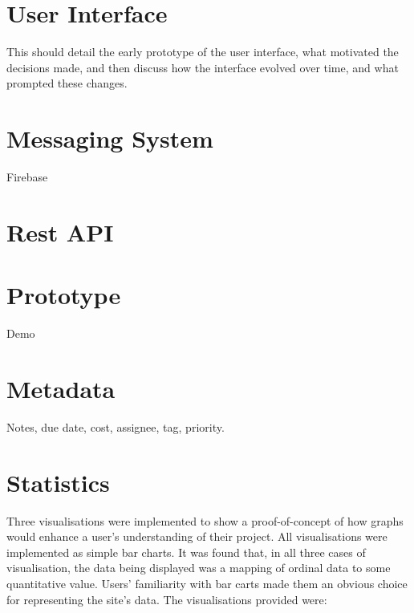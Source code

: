 \documentclass[a4paper]{l3proj}
\begin{document}
  \section{User Interface}
  \label{userInterface}

  This should detail the early prototype of the user interface, what motivated the decisions made, 
  and then discuss how the interface evolved over time, and what prompted these changes.

  \section{Messaging System}
  \label{messagingSystem}

  Firebase

  \section{Rest API}
  \label{restApi}


  \section{Prototype}
  \label{prototype}

  Demo

  \section{Metadata}
  \label{metadata}

  Notes, due date, cost, assignee, tag, priority.

  \section{Statistics}
  \label{statistics}

  Three visualisations were implemented to show a proof-of-concept of how graphs would enhance a user’s understanding of their project. 
  All visualisations were implemented as simple bar charts. It was found that, in all three cases of visualisation, the data being displayed was a mapping of ordinal data to some quantitative value. Users’ familiarity with bar carts made them an obvious choice for representing the site’s data. 
  The visualisations provided were:
\end{document}

